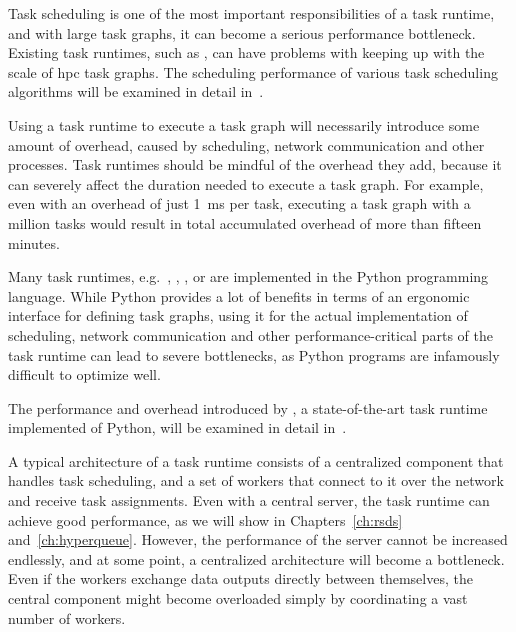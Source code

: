 \begin{description}[wide=0pt]
	\item[Scheduling] Task scheduling is one of the most important responsibilities of a task runtime, and with large
	task graphs, it can become a serious performance bottleneck. Existing task runtimes, such as
	\dask{}, can have problems with keeping up with the scale of
	\gls{hpc} task graphs. The scheduling performance of various task scheduling
	algorithms will be examined in detail in~.
	\item[Runtime overhead] Using a task runtime to execute a task graph will necessarily introduce
	some amount of overhead, caused by scheduling, network communication and other processes.
	Task runtimes should be mindful of the overhead they add, because it can severely
	affect the duration needed to execute a task graph. For example, even with an overhead of
	just \SI{1}{\milli\second} per task, executing
	a task graph with a million tasks would result in total accumulated overhead of more than fifteen
	minutes.

	Many task runtimes, e.g.\ \dask{}, \parsl{}, \balsam{}, \autosubmit{}
	or \snakemake{} are implemented in the Python programming language. While Python provides a
	lot of benefits in terms of an ergonomic interface for defining task graphs, using
	it for the actual implementation of scheduling, network communication and other
	performance-critical parts of the task runtime can lead to severe bottlenecks, as Python
	programs are infamously difficult to optimize well.

	The performance and overhead introduced by \dask{}, a state-of-the-art task
	runtime implemented of Python, will be examined in detail in~.

	\item[Architecture] A typical architecture of a task runtime consists of a centralized component
	that handles task scheduling, and a set of workers that connect to it over the network and
	receive task assignments. Even with a central server, the task runtime can achieve good
	performance, as we will show in Chapters~\ref{ch:rsds} and~\ref{ch:hyperqueue}.
	However, the performance of the server cannot be increased endlessly, and at some point, a
	centralized architecture will become a bottleneck. Even if the workers exchange data outputs
	directly between themselves, the central component might become overloaded simply by coordinating
	a vast number of workers.


\end{description}
